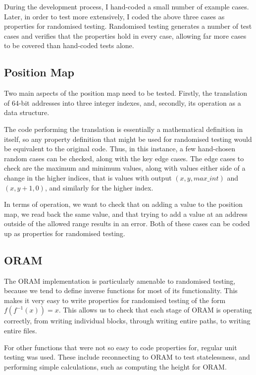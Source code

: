\documentclass[12pt,a4paper,twoside,openright]{report}
\begin{document}
During the development process, I hand-coded a small number of example cases. Later, in order to test more extensively, I coded the above three cases as properties for randomised testing. Randomised testing generates a number of test cases and verifies that the properties hold in every case, allowing far more cases to be covered than hand-coded tests alone.

\subsection{Position Map}

Two main aspects of the position map need to be tested. Firstly, the translation of 64-bit addresses into three integer indexes, and, secondly, its operation as a data structure.

The code performing the translation is essentially a mathematical definition in itself, so any property definition that might be used for randomised testing would be equivalent to the original code. Thus, in this instance, a few hand-chosen random cases can be checked, along with the key edge cases. The edge cases to check are the maximum and minimum values, along with values either side of a change in the higher indices, that is values with output $(x,y,max\_int)$ and $(x,y+1,0)$, and similarly for the higher index.

In terms of operation, we want to check that on adding a value to the position map, we read back the same value, and that trying to add a value at an address outside of the allowed range results in an error. Both of these cases can be coded up as properties for randomised testing.

\subsection{ORAM}

The ORAM implementation is particularly amenable to randomised testing, because we tend to define inverse functions for most of its functionality. This makes it very easy to write properties for randomised testing of the form $f(f^{-1}(x)) = x$. This allows us to check that each stage of ORAM is operating correctly, from writing individual blocks, through writing entire paths, to writing entire files.

For other functions that were not so easy to code properties for, regular unit testing was used. These include reconnecting to ORAM to test statelessness, and performing simple calculations, such as computing the height for ORAM.
\end{document}
